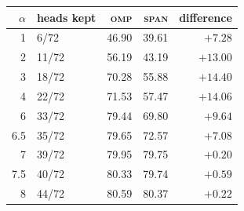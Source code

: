 \begin{tabular}{rlrrr}
\toprule
$\alpha$ & heads kept & \textsc{omp} & \textsc{span} & difference\\
\midrule
1 & 6/72 & 46.90 & 39.61 & \textbf{$+7.28$}\\
2 & 11/72 & 56.19 & 43.19 & \textbf{$+13.00$}\\
3 & 18/72 & 70.28 & 55.88 & \textbf{$+14.40$}\\
4 & 22/72 & 71.53 & 57.47 & \textbf{$+14.06$}\\
6 & 33/72 & 79.44 & 69.80 & \textbf{$+9.64$}\\
6.5 & 35/72 & 79.65 & 72.57 & \textbf{$+7.08$}\\
7 & 39/72 & 79.95 & 79.75 & $+0.20$\\
7.5 & 40/72 & 80.33 & 79.74 & $+0.59$\\
8 & 44/72 & 80.59 & 80.37 & $+0.22$\\
\bottomrule
\end{tabular}
